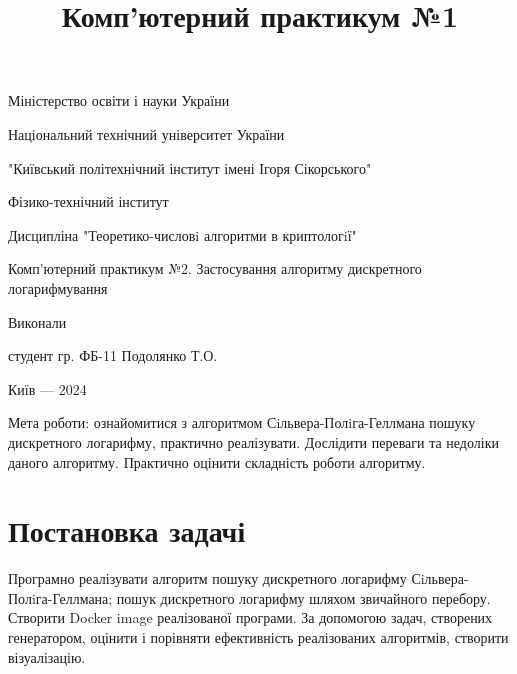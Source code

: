 

\title{Комп'ютерний практикум №1}
\date{}


\begin{center}
    Міністерство освіти і науки України

    Національний технічний університет України

    "Київський політехнічний інститут імені Ігоря Сікорського"

    Фізико-технічний інститут
\end{center}
\vspace{\baselineskip}
\vspace{\baselineskip}
\vspace{\baselineskip}
\begin{center}
    Дисципліна "Теоретико-числовi алгоритми в криптологiї"
\end{center}
    \vspace{\baselineskip}
    \begin{center}
        Комп'ютерний практикум №2. Застосування алгоритму дискретного логарифмування
    \end{center}
\vspace{\baselineskip}
\vspace{\baselineskip}
\vspace{\baselineskip}
\begin{center}
    Виконали
\end{center}
\begin{flushright}
    студент гр. ФБ-11 Подолянко Т.О.
\end{flushright}
\vfill
\begin{center}
    Київ — 2024
\end{center}
\thispagestyle{empty}
\pagebreak

Мета роботи: ознайомитися з алгоритмом Сiльвера-Полiга-Геллмана пошуку дискретного логарифму, практично реалізувати.
Дослідити переваги та недоліки даного алгоритму. Практично оцінити складність роботи алгоритму.


\section*{Постановка задачі}

Програмно реалізувати алгоритм пошуку дискретного логарифму Сiльвера-Полiга-Геллмана; пошук дискретного логарифму шляхом звичайного перебору.
Створити Docker image реалізованої програми. За допомогою задач, створених генератором, оцінити і порівняти ефективність реалізованих алгоритмів, 
створити візуалізацію.

